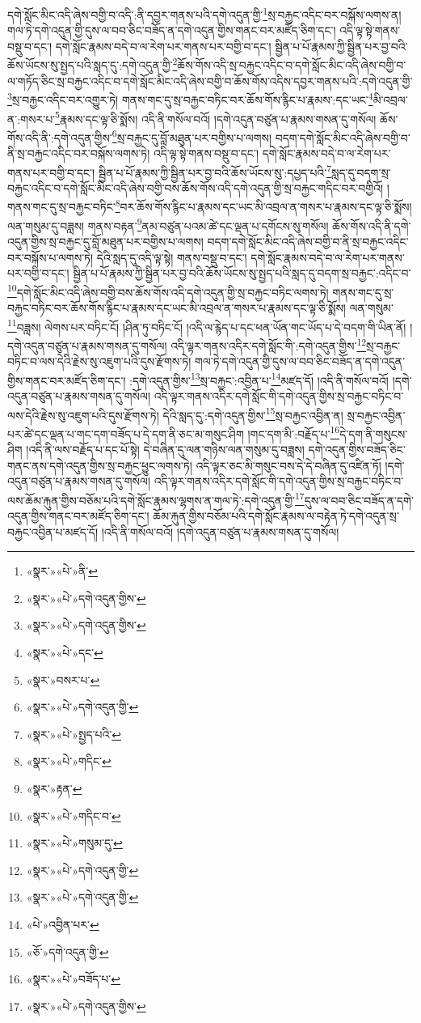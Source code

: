 དགེ་སློང་མིང་འདི་ཞེས་བགྱི་བ་འདི་:ནི་དབྱར་གནས་པའི་དགེ་འདུན་གྱི་\footnote{«སྣར་»«པེ་»ནི་}སྲ་བརྐྱང་འདིང་བར་བསྐོས་ལགས་ན། གལ་ཏེ་དགེ་འདུན་གྱི་དུས་ལ་བབ་ཅིང་བཟོད་ན་དགེ་འདུན་གྱིས་གནང་བར་མཛོད་ཅིག་དང་། འདི་ལྟ་སྟེ་གནས་བསྡུ་བ་དང་། དགེ་སློང་རྣམས་བདེ་བ་ལ་རེག་པར་གནས་པར་བགྱི་བ་དང་། སྦྱིན་པ་པོ་རྣམས་ཀྱི་སྦྱིན་པར་བྱ་བའི་ཆོས་ཡོངས་སུ་སྤྱད་པའི་སླད་དུ་:དགེ་འདུན་གྱི་\footnote{«སྣར་»«པེ་»དགེ་འདུན་གྱིས་}ཆོས་གོས་འདི་སྲ་བརྐྱང་འདིང་བ་དགེ་སློང་མིང་འདི་ཞེས་བགྱི་བ་ལ་གཏོད་ཅིང་སྲ་བརྐྱང་འདིང་བ་དགེ་སློང་མིང་འདི་ཞེས་བགྱི་བ་ཆོས་གོས་འདིས་དབྱར་གནས་པའི་:དགེ་འདུན་གྱི་\footnote{«སྣར་»«པེ་»དགེ་འདུན་གྱིས་}སྲ་བརྐྱང་འདིང་བར་འགྱུར་ཏེ། གནས་གང་དུ་སྲ་བརྐྱང་བཏིང་བར་ཆོས་གོས་རྙིང་པ་རྣམས་:དང་ཡང་\footnote{«སྣར་»«པེ་»དང་}མི་འབྲལ་ན་:གསར་པ་\footnote{«སྣར་»བསར་པ་}རྣམས་དང་ལྟ་ཅི་སྨོས། འདི་ནི་གསོལ་བའོ། །དགེ་འདུན་བཙུན་པ་རྣམས་གསན་དུ་གསོལ། ཆོས་གོས་འདི་ནི་:དགེ་འདུན་གྱིས་\footnote{«སྣར་»«པེ་»དགེ་འདུན་གྱི་}སྲ་བརྐྱང་དུ་བློ་མཐུན་པར་བགྱིས་པ་ལགས། བདག་དགེ་སློང་མིང་འདི་ཞེས་བགྱི་བ་ནི་སྲ་བརྐྱང་འདིང་བར་བསྐོས་ལགས་ཏེ། འདི་ལྟ་སྟེ་གནས་བསྡུ་བ་དང་། དགེ་སློང་རྣམས་བདེ་བ་ལ་རེག་པར་གནས་པར་བགྱི་བ་དང་། སྦྱིན་པ་པོ་རྣམས་ཀྱི་སྦྱིན་པར་བྱ་བའི་ཆོས་ཡོངས་སུ་:དཔྱད་པའི་\footnote{«སྣར་»«པེ་»སྤྱད་པའི་}སླད་དུ་བདག་སྲ་བརྐྱང་འདིང་བ་དགེ་སློང་མིང་འདི་ཞེས་བགྱི་བས་ཆོས་གོས་འདི་དགེ་འདུན་གྱི་སྲ་བརྐྱང་གདིང་བར་བགྱིའོ། །གནས་གང་དུ་སྲ་བརྐྱང་བཏིང་\footnote{«སྣར་»«པེ་»གདིང་}བར་ཆོས་གོས་རྙིང་པ་རྣམས་དང་ཡང་མི་འབྲལ་ན་གསར་པ་རྣམས་དང་ལྟ་ཅི་སྨོས། ལན་གསུམ་དུ་བཟླས། གནས་བརྟན་\footnote{«སྣར་»རྟན་}ནམ་བཙུན་པའམ་ཚེ་དང་ལྡན་པ་དགོངས་སུ་གསོལ། ཆོས་གོས་འདི་ནི་དགེ་འདུན་གྱིས་སྲ་བརྐྱང་དུ་བློ་མཐུན་པར་བགྱིས་པ་ལགས། བདག་དགེ་སློང་མིང་འདི་ཞེས་བགྱི་བ་ནི་སྲ་བརྐྱང་འདིང་བར་བསྐོས་པ་ལགས་ཏེ། དེའི་སླད་དུ་འདི་ལྟ་སྟེ། གནས་བསྡུ་བ་དང་། དགེ་སློང་རྣམས་བདེ་བ་ལ་རེག་པར་གནས་པར་བགྱི་བ་དང་། སྦྱིན་པ་པོ་རྣམས་ཀྱི་སྦྱིན་པར་བྱ་བའི་ཆོས་ཡོངས་སུ་སྤྱད་པའི་སླད་དུ་བདག་སྲ་བརྐྱང་:འདིང་བ་\footnote{«སྣར་»«པེ་»གདིང་བ་}དགེ་སློང་མིང་འདི་ཞེས་བགྱི་བས་ཆོས་གོས་འདི་དགེ་འདུན་གྱི་སྲ་བརྐྱང་བཏིང་ལགས་ཏེ། གནས་གང་དུ་སྲ་བརྐྱང་བཏིང་བར་ཆོས་གོས་རྙིང་པ་རྣམས་དང་ཡང་མི་འབྲལ་ན་གསར་པ་རྣམས་དང་ལྟ་ཅི་སྨོས། ལན་གསུམ་\footnote{«སྣར་»«པེ་»གསུམ་དུ་}བཟླས། ལེགས་པར་བཏིང་ངོ། །ཤིན་ཏུ་བཏིང་ངོ། །འདི་ལ་རྙེད་པ་དང་ཕན་ཡོན་གང་ཡོད་པ་དེ་བདག་གི་ཡིན་ནོ། །དགེ་འདུན་བཙུན་པ་རྣམས་གསན་དུ་གསོལ། འདི་ལྟར་གནས་འདིར་དགེ་སློང་གི་:དགེ་འདུན་གྱིས་\footnote{«སྣར་»«པེ་»དགེ་འདུན་གྱི་}སྲ་བརྐྱང་བཏིང་བ་ལས་དེའི་རྗེས་སུ་འཇུག་པའི་དུས་རྫོགས་ཏེ། གལ་ཏེ་དགེ་འདུན་གྱི་དུས་ལ་བབ་ཅིང་བཟོད་ན་དགེ་འདུན་གྱིས་གནང་བར་མཛོད་ཅིག་དང་། :དགེ་འདུན་གྱིས་\footnote{«སྣར་»«པེ་»དགེ་འདུན་གྱི་}སྲ་བརྐྱང་:འབྱིན་པ་\footnote{«པེ་»འབྱིན་པར་}མཛད་དོ། །འདི་ནི་གསོལ་བའོ། །དགེ་འདུན་བཙུན་པ་རྣམས་གསན་དུ་གསོལ། འདི་ལྟར་གནས་འདིར་དགེ་སློང་གི་དགེ་འདུན་གྱིས་སྲ་བརྐྱང་བཏིང་བ་ལས་དེའི་རྗེས་སུ་འཇུག་པའི་དུས་རྫོགས་ཏེ། དེའི་སླད་དུ་:དགེ་འདུན་གྱིས་\footnote{«ཅོ་»དགེ་འདུན་གྱི་}སྲ་བརྐྱང་འབྱིན་ན། སྲ་བརྐྱང་འབྱིན་པར་ཚེ་དང་ལྡན་པ་གང་དག་བཟོད་པ་དེ་དག་ནི་ཅང་མ་གསུང་ཤིག །གང་དག་མི་:བརྗོད་པ་\footnote{«སྣར་»«པེ་»བཟོད་པ་}དེ་དག་ནི་གསུངས་ཤིག །འདི་ནི་ལས་བརྗོད་པ་དང་པོ་སྟེ། དེ་བཞིན་དུ་ལན་གཉིས་ལན་གསུམ་དུ་བཟླས། དགེ་འདུན་གྱིས་བཟོད་ཅིང་གནང་ནས་དགེ་འདུན་གྱིས་སྲ་བརྐྱང་ཕྱུང་ལགས་ཏེ། འདི་ལྟར་ཅང་མི་གསུང་བས་དེ་དེ་བཞིན་དུ་འཛིན་ཏོ། །དགེ་འདུན་བཙུན་པ་རྣམས་གསན་དུ་གསོལ། འདི་ལྟར་གནས་འདིར་དགེ་སློང་གི་དགེ་འདུན་གྱིས་སྲ་བརྐྱང་བཏིང་བ་ལས་ཆོམ་རྐུན་གྱིས་བཅོམ་པའི་དགེ་སློང་རྣམས་ལྷགས་ན་གལ་ཏེ་:དགེ་འདུན་གྱི་\footnote{«སྣར་»«པེ་»དགེ་འདུན་གྱིས་}དུས་ལ་བབ་ཅིང་བཟོད་ན་དགེ་འདུན་གྱིས་གནང་བར་མཛོད་ཅིག་དང་། ཆོམ་རྐུན་གྱིས་བཅོམ་པའི་དགེ་སློང་རྣམས་ལ་བརྟེན་ཏེ་དགེ་འདུན་སྲ་བརྐྱང་འབྱིན་པ་མཛད་དོ། །འདི་ནི་གསོལ་བའོ། །དགེ་འདུན་བཙུན་པ་རྣམས་གསན་དུ་གསོལ། 